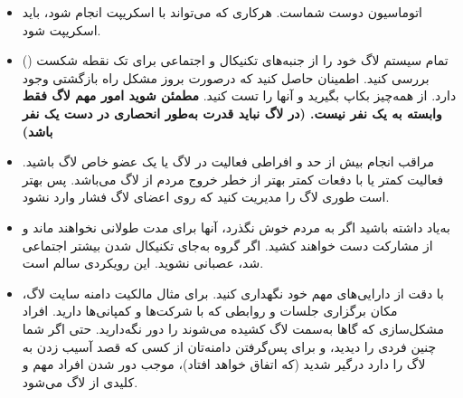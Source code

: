 \begin{itemize}

\item
اتوماسیون دوست شماست. هرکاری که می‌تواند با اسکریپت انجام شود،
باید اسکریپت شود.

\item
تمام سیستم لاگ خود را از جنبه‌های تکنیکال و اجتماعی برای تک نقطه شکست
()
بررسی کنید. اطمینان حاصل کنید که درصورت بروز مشکل راه بازگشتی وجود دارد.
از همه‌چیز بکاپ بگیرید و آنها را تست کنید.
{\bfseries
مطمئن شوید امور مهم لاگ فقط وابسته به یک نفر نیست.
(در لاگ نباید قدرت به‌طور انحصاری در دست یک نفر باشد)
}

\item
مراقب انجام بیش از حد و افراطی فعالیت در لاگ یا یک عضو خاص لاگ باشید.
فعالیت کمتر یا با دفعات کمتر بهتر از خطر خروج مردم از لاگ می‌باشد.
پس بهتر است طوری لاگ را مدیریت کنید که روی اعضای لاگ فشار وارد نشود.

\item
به‌یاد داشته باشید اگر به مردم خوش نگذرد، آنها برای مدت طولانی
نخواهند ماند و از مشارکت دست خواهند کشید. اگر گروه به‌جای تکنیکال شدن
بیشتر اجتماعی شد، عصبانی نشوید. این رویکردی سالم است.

\item
با دقت از دارایی‌های مهم خود نگهداری کنید. برای مثال مالکیت دامنه سایت لاگ،
مکان برگزاری جلسات و روابطی که با شرکت‌ها و کمپانی‌ها دارید.
افراد مشکل‌سازی که گاها به‌سمت لاگ کشیده می‌شوند را دور نگه‌دارید.
حتی اگر شما چنین فردی را دیدید، و برای پس‌گرفتن دامنه‌تان از کسی که قصد آسیب زدن به
لاگ را دارد درگیر شدید (که اتفاق خواهد افتاد)، موجب دور شدن افراد مهم و کلیدی از لاگ می‌شود.
\end{itemize}

